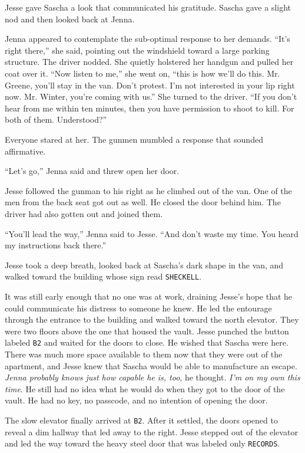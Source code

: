 \documentclass[12pt]{book}
\begin{document}
Jesse gave Sascha a look that communicated his gratitude.  Sascha gave a slight nod and then looked back at Jenna.

Jenna appeared to contemplate the sub-optimal response to her demands.  ``It's right there,'' she said, pointing out the windshield toward a large parking structure.  The driver nodded.  She quietly holstered her handgun and pulled her coat over it.  ``Now listen to me,'' she went on, ``this is how we'll do this.  Mr. Greene, you'll stay in the van.  Don't protest.  I'm not interested in your lip right now.  Mr. Winter, you're coming with us.''  She turned to the driver.  ``If you don't hear from me within ten minutes, then you have permission to shoot to kill.  For both of them.  Understood?''

Everyone stared at her.  The gunmen mumbled a response that sounded affirmative.

``Let's go,'' Jenna said and threw open her door.

Jesse followed the gunman to his right as he climbed out of the van.  One of the men from the back seat got out as well.  He closed the door behind him.  The driver had also gotten out and joined them.

``You'll lead the way,'' Jenna said to Jesse.  ``And don't waste my time.  You heard my instructions back there.''

Jesse took a deep breath, looked back at Sascha's dark shape in the van, and walked toward the building whose sign read \texttt{SHECKELL}.

It was still early enough that no one was at work, draining Jesse's hope that he could communicate his distress to someone he knew.  He led the entourage through the entrance to the building and walked toward the north elevator.  They were two floors above the one that housed the vault.  Jesse punched the button labeled \texttt{B2} and waited for the doors to close.  He wished that Sascha were here.  There was much more space available to them now that they were out of the apartment, and Jesse knew that Sascha would be able to manufacture an escape.  \emph{Jenna probably knows just how capable he is, too}, he thought.  \emph{I'm on my own this time}.  He still had no idea what he would do when they got to the door of the vault.  He had no key, no passcode, and no intention of opening the door.

The slow elevator finally arrived at \texttt{B2}.  After it settled, the doors opened to reveal a dim hallway that led away to the right.  Jesse stepped out of the elevator and led the way toward the heavy steel door that was labeled only \texttt{RECORDS}.
\end{document}
